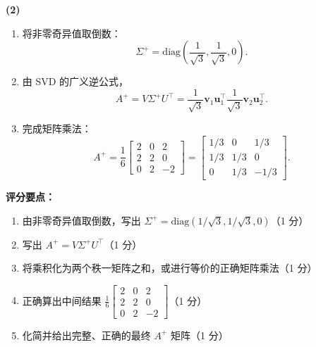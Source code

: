 \documentclass[10pt,a4paper]{exam-zh}
\newcommand{\bvec}[1]{\boldsymbol{#1}}
\newcommand{\diag}{\mathrm{diag}}
\newenvironment{grading}
  {\par\smallskip\Needspace{5\baselineskip}\small
   \noindent\textcolor{gradingred}{\textbf{评分要点：}}
   \begin{enumerate}[label=\textcolor{gradingred}{\arabic*.},
     leftmargin=2.4em,itemsep=0pt,topsep=2pt,parsep=0pt]}
  {\end{enumerate}\smallskip}
\newcommand{\gradeitem}[2]{\item #1（\textcolor{gradingred}{#2 分}）}
\newenvironment{answersteps}
  {\begin{enumerate}[label=\textbf{步骤 \arabic*.},
    leftmargin=4.8em,labelsep=0.6em,itemsep=2pt,topsep=3pt,parsep=0pt]}
  {\end{enumerate}}
\newcommand{\subanswer}[1]{%
  \par\medskip\Needspace{6\baselineskip}\noindent\textbf{#1}\par}
\begin{document}
\begin{solution}
\subanswer{(2)}
\begin{answersteps}
  \item 将非零奇异值取倒数：
  \[
  \Sigma^+=\diag\left(\frac1{\sqrt3},\frac1{\sqrt3},0\right).
  \]
  \item 由 SVD 的广义逆公式，
  \[
  A^+=V\Sigma^+U^\top
  =\frac1{\sqrt3}\bvec v_1\bvec u_1^\top
   \frac1{\sqrt3}\bvec v_2\bvec u_2^\top.
  \]
  \item 完成矩阵乘法：
  \[
  A^+
  =\frac16
  \begin{bmatrix}
  2&0&2\\
  2&2&0\\
  0&2&-2
  \end{bmatrix}
  =
  \boxed{
  \begin{bmatrix}
  1/3&0&1/3\\
  1/3&1/3&0\\
  0&1/3&-1/3
  \end{bmatrix}}.
  \]
\end{answersteps}
\begin{grading}
  \gradeitem{由非零奇异值取倒数，写出
  $\Sigma^+=\diag(1/\sqrt3,1/\sqrt3,0)$}{1}
  \gradeitem{写出 $A^+=V\Sigma^+U^\top$}{1}
  \gradeitem{将乘积化为两个秩一矩阵之和，或进行等价的正确矩阵乘法}{1}
  \gradeitem{正确算出中间结果
  $\frac16\begin{bmatrix}2&0&2\\2&2&0\\0&2&-2\end{bmatrix}$}{1}
  \gradeitem{化简并给出完整、正确的最终 $A^+$ 矩阵}{1}
\end{grading}


\end{solution}
\end{document}
